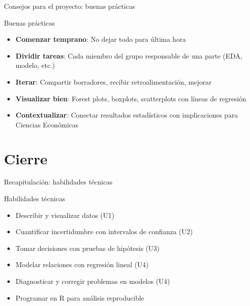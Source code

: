 \documentclass[aspectratio=169, 11pt]{beamer}
\begin{document}
\begin{frame}{Consejos para el proyecto: buenas prácticas}
\begin{exampleblock}{Buenas prácticas}
\begin{itemize}
\item \textbf{Comenzar temprano}: No dejar todo para última hora
\item \textbf{Dividir tareas}: Cada miembro del grupo responsable de una parte (EDA, modelo, etc.)
\item \textbf{Iterar}: Compartir borradores, recibir retroalimentación, mejorar
\item \textbf{Visualizar bien}: Forest plots, boxplots, scatterplots con líneas de regresión
\item \textbf{Contextualizar}: Conectar resultados estadísticos con implicaciones para Ciencias Econ\'omicas
\end{itemize}
\end{exampleblock}
\end{frame}

\section{Cierre}

\begin{frame}{Recapitulación: habilidades técnicas}
\begin{block}{Habilidades técnicas}
\begin{itemize}
\item Describir y visualizar datos (U1)
\item Cuantificar incertidumbre con intervalos de confianza (U2)
\item Tomar decisiones con pruebas de hipótesis (U3)
\item Modelar relaciones con regresión lineal (U4)
\item Diagnosticar y corregir problemas en modelos (U4)
\item Programar en R para análisis reproducible
\end{itemize}
\end{block}
\end{frame}
\end{document}
